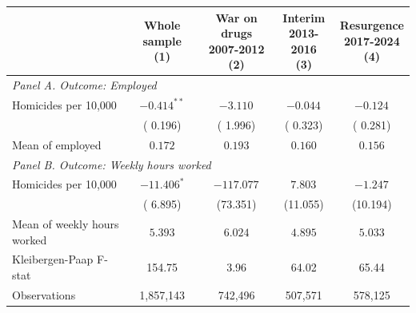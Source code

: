 \begin{tabular}{l c c c c}
\hline\hline
 & \shortstack{Whole sample \\ (1)} & \shortstack{War on drugs \\ 2007-2012 \\ (2)} & \shortstack{Interim \\ 2013-2016 \\ (3)} & \shortstack{Resurgence \\ 2017-2024 \\ (4)} \\
\hline
\multicolumn{5}{l}{{\small \textit{Panel A. Outcome: Employed}}} \\
Homicides per 10,000
 & $-0.414^{**}$ & $-3.110^{}$ & $-0.044^{}$ & $-0.124^{}$ \\
 & ( 0.196) & ( 1.996) & ( 0.323) & ( 0.281) \\
Mean of employed
 & $ 0.172$ & $ 0.193$ & $ 0.160$ & $ 0.156$ \\
\hline
\multicolumn{5}{l}{{\small \textit{Panel B. Outcome: Weekly hours worked}}} \\
Homicides per 10,000
 & $-11.406^{*}$ & $-117.077^{}$ & $ 7.803^{}$ & $-1.247^{}$ \\
 & ( 6.895) & (73.351) & (11.055) & (10.194) \\
Mean of weekly hours worked
 & $ 5.393$ & $ 6.024$ & $ 4.895$ & $ 5.033$ \\
\hline
Kleibergen-Paap F-stat
 & 154.75 &   3.96 &  64.02 &  65.44 \\
\hline
Observations
 & 1,857,143 &   742,496 &   507,571 &   578,125 \\
\hline\hline
\end{tabular}
